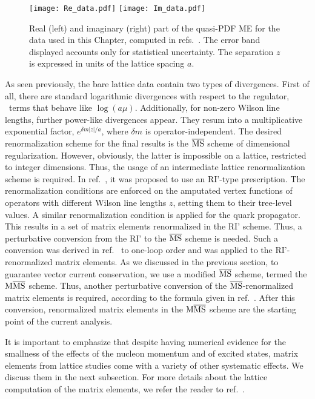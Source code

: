 \begin{figure}[t!]
    \begin{center}
        \texttt{[image: Re\_data.pdf]}
        \texttt{[image: Im\_data.pdf]}
        \caption{Real (left) and imaginary (right) part 
        of the quasi-PDF ME for the data used in this Chapter, computed in refs.~\cite{Alexandrou:2018pbm, Alexandrou:2019lfo}.
        The error band displayed accounts only for statistical uncertainty.
        The separation $z$ is expressed in units of the lattice spacing $a$.} 
        \label{fig::data} 
    \end{center}
\end{figure}
%
As seen previously, the bare lattice data contain two types of divergences. First of all, there are
standard logarithmic divergences with respect to the regulator, \ie\ terms that
behave like $\log(a\mu)$. Additionally, for non-zero Wilson line lengths,
further power-like divergences appear. They resum into a multiplicative
exponential factor, $e^{\delta m |z|/a}$, where $\delta m$ is
operator-independent. The desired renormalization scheme for the final results
is the $\overline{\mathrm{MS}}$ scheme of dimensional regularization. However, obviously, the
latter is impossible on a lattice, restricted to integer dimensions. Thus, the
usage of an intermediate lattice renormalization scheme is required. In
ref.~\cite{Alexandrou:2017huk}, it was proposed to use an RI'-type prescription.
The renormalization conditions are enforced on the amputated vertex functions of
operators with different Wilson line lengths $z$, setting them to their
tree-level values. A similar renormalization condition is applied for the quark
propagator. This results in a set of matrix elements renormalized in the RI'
scheme. Thus, a perturbative conversion from the RI' to the $\overline{\mathrm{MS}}$ scheme is
needed. Such a conversion was derived in ref.~\cite{Constantinou:2017sej} to
one-loop order and was applied to the RI'-renormalized matrix elements. As we
discussed in the previous section, to guarantee vector current conservation, we
use a modified $\overline{\mathrm{MS}}$ scheme, termed the ${\rm M}\overline{\mathrm{MS}}$ scheme. Thus, another
perturbative conversion of the $\overline{\mathrm{MS}}$-renormalized matrix elements is required,
according to the formula given in ref.~\cite{Alexandrou:2019lfo}. After this
conversion, renormalized matrix elements in the ${\rm M}\overline{\mathrm{MS}}$ scheme are the starting
point of the current analysis.

It is important to emphasize that despite having numerical evidence for the
smallness of the effects of the nucleon momentum and of excited states, matrix
elements from lattice studies come with a variety of other systematic effects.
We discuss them in the next subsection. For more details about the lattice
computation of the matrix elements, we refer the reader to
ref.~\cite{Alexandrou:2019lfo}.



